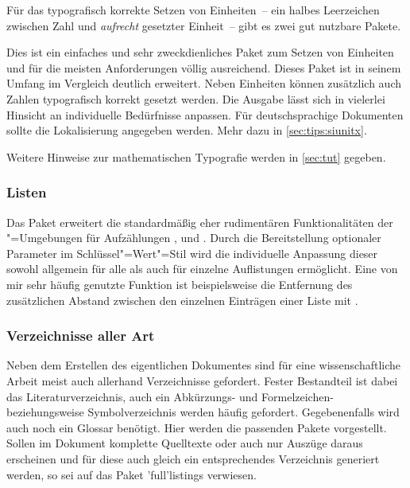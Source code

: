 Für das typografisch korrekte Setzen von Einheiten~-- ein halbes Leerzeichen 
zwischen Zahl und \emph{aufrecht} gesetzter Einheit~-- gibt es zwei gut 
nutzbare Pakete.

\begin{DeclarePackages}
%
  Dies ist ein einfaches und sehr zweckdienliches Paket zum Setzen von 
  Einheiten und für die meisten Anforderungen völlig ausreichend.
  Dieses Paket ist in seinem Umfang im Vergleich deutlich erweitert. Neben 
  Einheiten können zusätzlich auch Zahlen typografisch korrekt gesetzt werden. 
  Die Ausgabe lässt sich in vielerlei Hinsicht an individuelle Bedürfnisse 
  anpassen. Für deutschsprachige Dokumenten sollte die Lokalisierung angegeben 
  werden. Mehr dazu in \autoref{sec:tips:siunitx}.
%
\end{DeclarePackages}

Weitere Hinweise zur mathematischen Typografie werden in \autoref{sec:tut} 
gegeben.%
%



\subsubsection{%
  Listen%
}
%
\begin{DeclarePackages}
  Das Paket  erweitert die standardmäßig eher rudimentären 
  Funktionalitäten der "=Umgebungen für Aufzählungen 
  ,  und .
  Durch die Bereitstellung optionaler Parameter im Schlüssel"=Wert"=Stil wird 
  die individuelle Anpassung dieser sowohl allgemein für alle als auch für 
  einzelne Auflistungen ermöglicht. Eine von mir sehr häufig genutzte Funktion 
  ist beispielsweise die Entfernung des zusätzlichen Abstand zwischen den 
  einzelnen Einträgen einer Liste mit .
\end{DeclarePackages}
%



\subsubsection{%
  Verzeichnisse aller Art%
}
%
Neben dem Erstellen des eigentlichen Dokumentes sind für eine wissenschaftliche 
Arbeit meist auch allerhand Verzeichnisse gefordert. Fester Bestandteil ist 
dabei das Literaturverzeichnis, auch ein Abkürzungs- und Formelzeichen- 
beziehungsweise Symbolverzeichnis werden häufig gefordert. Gegebenenfalls wird 
auch noch ein Glossar benötigt. Hier werden die passenden Pakete vorgestellt. 
Sollen im Dokument komplette Quelltexte oder auch nur Auszüge daraus erscheinen 
und für diese auch gleich ein entsprechendes Verzeichnis generiert werden, so 
sei auf das Paket \Package'full'{listings} verwiesen.

